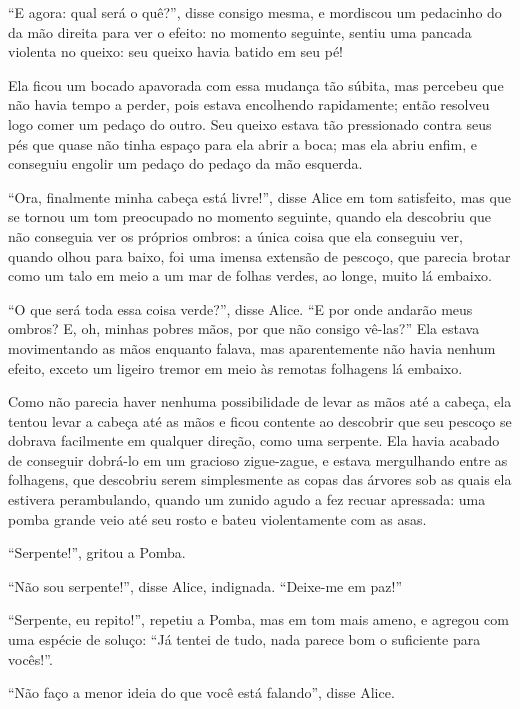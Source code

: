 ``E agora: qual será o quê?'', disse consigo mesma, e mordiscou um
pedacinho do da mão direita para ver o efeito: no momento seguinte,
sentiu uma pancada violenta no queixo: seu queixo havia batido em seu
pé!

Ela ficou um bocado apavorada com essa mudança tão súbita, mas percebeu
que não havia tempo a perder, pois estava encolhendo rapidamente; então
resolveu logo comer um pedaço do outro. Seu queixo estava tão
pressionado contra seus pés que quase não tinha espaço para ela abrir a
boca; mas ela abriu enfim, e conseguiu engolir um pedaço do pedaço da
mão esquerda.

``Ora, finalmente minha cabeça está livre!'', disse Alice em tom
satisfeito, mas que se tornou um tom preocupado no momento seguinte,
quando ela descobriu que não conseguia ver os próprios ombros: a única
coisa que ela conseguiu ver, quando olhou para baixo, foi uma imensa
extensão de pescoço, que parecia brotar como um talo em meio a um mar de
folhas verdes, ao longe, muito lá embaixo.

``O que será toda essa coisa verde?'', disse Alice. ``E por onde andarão
meus ombros? E, oh, minhas pobres mãos, por que não consigo vê-las?''
Ela estava movimentando as mãos enquanto falava, mas aparentemente não
havia nenhum efeito, exceto um ligeiro tremor em meio às remotas
folhagens lá embaixo.

Como não parecia haver nenhuma possibilidade de levar as mãos até a
cabeça, ela tentou levar a cabeça até as mãos e ficou contente ao
descobrir que seu pescoço se dobrava facilmente em qualquer direção,
como uma serpente. Ela havia acabado de conseguir dobrá-lo em um
gracioso zigue-zague, e estava mergulhando entre as folhagens, que
descobriu serem simplesmente as copas das árvores sob as quais ela
estivera perambulando, quando um zunido agudo a fez recuar apressada:
uma pomba grande veio até seu rosto e bateu violentamente com as asas.

``Serpente!'', gritou a Pomba.

``Não sou serpente!'', disse Alice, indignada. ``Deixe-me em paz!''

``Serpente, eu repito!'', repetiu a Pomba, mas em tom mais ameno, e
agregou com uma espécie de soluço: ``Já tentei de tudo, nada parece bom
o suficiente para vocês!''.

``Não faço a menor ideia do que você está falando'', disse Alice.


